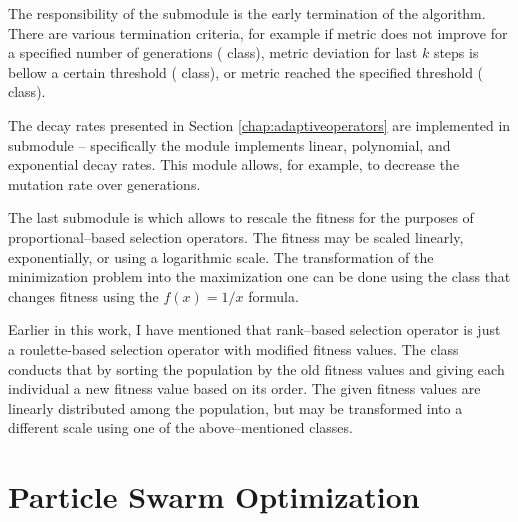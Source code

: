 The responsibility of the  submodule is the early termination of the algorithm. There are various termination criteria, for example if metric does not improve for a specified number of generations ( class), metric deviation for last $k$ steps is bellow a certain threshold ( class), or metric reached the specified threshold ( class).

The decay rates presented in Section \ref{chap:adaptiveoperators} are implemented in submodule  -- specifically the module implements linear, polynomial, and exponential decay rates. This module allows, for example, to decrease the mutation rate over generations.

The last submodule is  which allows to rescale the fitness for the purposes of proportional--based selection operators. The fitness may be scaled linearly, exponentially, or using a logarithmic scale. The transformation of the minimization problem into the maximization one can be done using the  class that changes fitness using the $f(x)=1/x$ formula.

Earlier in this work, I have mentioned that rank--based selection operator is just a roulette-based selection operator with modified fitness values. The class  conducts that by sorting the population by the old fitness values and giving each individual a new fitness value based on its order. The given fitness values are linearly distributed among the population, but may be transformed into a different scale using one of the above--mentioned classes.




\section{Particle Swarm Optimization}

